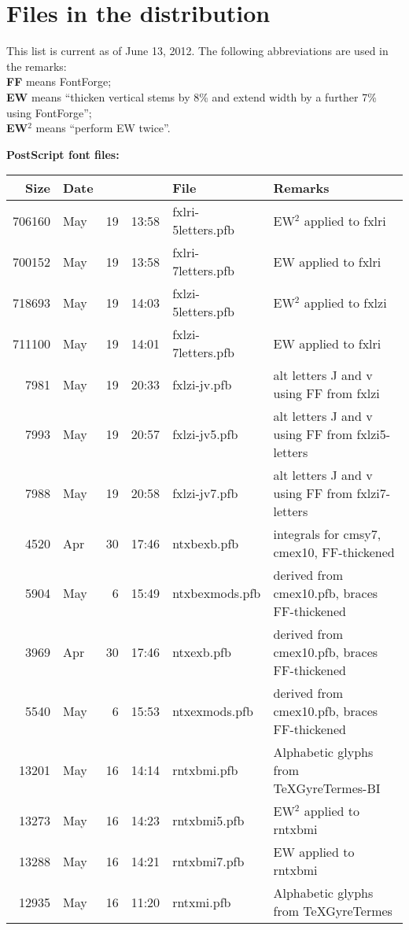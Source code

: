 \documentclass[10pt]{amsart}
\begin{document}
\section{Files in the distribution}
This list is current as of June 13, 2012. The following abbreviations are used in the remarks:\\
\textbf{FF} means FontForge;\\
\textbf{EW} means ``thicken vertical stems by 8\% and extend width by a further 7\% using FontForge'';\\
\textbf{EW}${}^2$ means ``perform EW twice''.

\newpage
\textbf{PostScript font files:}

\begin{center}
  \begin{tabular}{@{} rlrrll @{}}
    \toprule
    Size & Date &  &  & File &Remarks\\ 
    \midrule
706160&May&19&13:58&fxlri-5letters.pfb& EW${}^2$ applied to fxlri\\
700152&May&19&13:58&fxlri-7letters.pfb& EW applied to fxlri\\
718693&May&19&14:03&fxlzi-5letters.pfb& EW${}^2$ applied to fxlzi\\
711100&May&19&14:01&fxlzi-7letters.pfb& EW applied to fxlri\\
7981&May&19&20:33&fxlzi-jv.pfb& alt letters J and v using FF from fxlzi\\
7993&May&19&20:57&fxlzi-jv5.pfb& alt letters J and v using FF from fxlzi5-letters\\
7988&May&19&20:58&fxlzi-jv7.pfb& alt letters J and v using FF from fxlzi7-letters\\
4520&Apr&30&17:46&ntxbexb.pfb& integrals for cmsy7, cmex10, FF-thickened\\
5904&May&6&15:49&ntxbexmods.pfb& derived from cmex10.pfb, braces FF-thickened\\
3969&Apr&30&17:46&ntxexb.pfb& derived from cmex10.pfb, braces FF-thickened\\
5540&May&6&15:53&ntxexmods.pfb& derived from cmex10.pfb, braces FF-thickened\\
13201&May&16&14:14&rntxbmi.pfb& Alphabetic glyphs from TeXGyreTermes-BI\\
13273&May&16&14:23&rntxbmi5.pfb& EW${}^2$ applied to rntxbmi\\
13288&May&16&14:21&rntxbmi7.pfb& EW applied to rntxbmi\\
12935&May&16&11:20&rntxmi.pfb& Alphabetic glyphs from TeXGyreTermes\\

\end{tabular}
\end{center}
\end{document}
